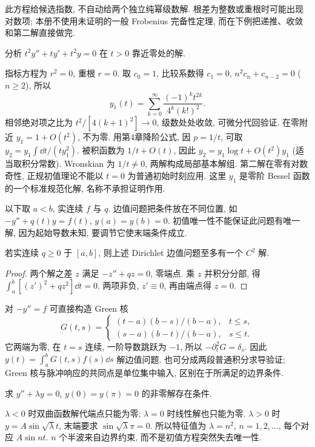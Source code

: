 此方程给候选指数, 不自动给两个独立纯幂级数解. 根差为整数或重根时可能出现对数项; 本册不使用未证明的一般 Frobenius 完备性定理, 而在下例把递推、收敛和第二解直接做完.
\begin{example}分析 $t^2y''+ty'+t^2y=0$ 在 $t>0$ 靠近零处的解.\end{example}
\begin{solution}
指标方程为 $r^2=0$, 重根 $r=0$. 取 $c_0=1$, 比较系数得 $c_1=0$, $n^2c_n+c_{n-2}=0$ ($n\ge2$), 所以
\[
y_1(t)=\sum_{k=0}^\infty\frac{(-1)^kt^{2k}}{4^k(k!)^2}.
\]
相邻绝对项之比为 $t^2/[4(k+1)^2]\to0$, 级数处处收敛, 可微分代回验证. 在零附近 $y_1=1+O(t^2)$, 不为零. 用第4章降阶公式, 因 $p=1/t$, 可取
$y_2=y_1\int\dd t/(t y_1^2)$. 被积函数为 $1/t+O(t)$, 因此 $y_2=y_1\log t+O(t^2)y_1$ (适当取积分常数). Wronskian 为 $1/t\ne0$, 两解构成局部基本解组. 第二解在零有对数奇性, 正规初值理论不能以 $t=0$ 为普通初始时刻应用. 这里 $y_1$ 是零阶 Bessel 函数的一个标准规范化解, 名称不承担证明作用.
\end{solution}
以下取 $a<b$, 实连续 $f$ 与 $q$. 边值问题把条件放在不同位置, 如 $-y''+q(t)y=f(t)$, $y(a)=y(b)=0$. 初值唯一性不能保证此问题有唯一解, 因为起始导数未知, 要调节它使末端条件成立.
\begin{proposition}
若实连续 $q\ge0$ 于 $[a,b]$, 则上述 Dirichlet 边值问题至多有一个 $C^2$ 解.
\end{proposition}
\begin{proof}
两个解之差 $z$ 满足 $-z''+qz=0$, 零端点. 乘 $z$ 并积分分部, 得 $\int_a^b[(z')^2+qz^2]\dd t=0$. 两项非负, $z'\equiv0$, 再由端点得 $z=0$.
\end{proof}
对 $-y''=f$ 可直接构造 Green 核
\[
G(t,s)=\begin{cases}(t-a)(b-s)/(b-a),&t\le s,\\(s-a)(b-t)/(b-a),&s\le t.\end{cases}
\]
它两端为零, 在 $t=s$ 连续, 一阶导数跳跃为 $-1$, 所以 $-\partial_t^2G=\delta_s$. 因此 $y(t)=\int_a^bG(t,s)f(s)\dd s$ 解边值问题. 也可分成两段普通积分求导验证; Green 核与脉冲响应的共同点是单位集中输入, 区别在于所满足的边界条件.
\begin{example}求 $y''+\lambda y=0$, $y(0)=y(\pi)=0$ 的非零解存在条件.\end{example}
\begin{solution}
$\lambda<0$ 时双曲函数解代端点只能为零; $\lambda=0$ 时线性解也只能为零. $\lambda>0$ 时 $y=A\sin\sqrt\lambda t$, 末端要求 $\sin\sqrt\lambda\pi=0$. 所以特征值为 $\lambda=n^2$, $n=1,2,\ldots$, 每个对应 $A\sin nt$. $n$ 个半波来自边界约束, 而不是初值方程突然失去唯一性.
\end{solution}
